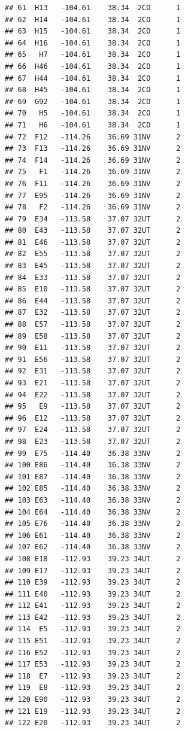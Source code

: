 \documentclass[]{article}
\begin{document}
\begin{verbatim}
## 61  H13   -104.61    38.34  2CO      1
## 62  H14   -104.61    38.34  2CO      1
## 63  H15   -104.61    38.34  2CO      1
## 64  H16   -104.61    38.34  2CO      1
## 65   H7   -104.61    38.34  2CO      1
## 66  H46   -104.61    38.34  2CO      1
## 67  H44   -104.61    38.34  2CO      1
## 68  H45   -104.61    38.34  2CO      1
## 69  G92   -104.61    38.34  2CO      1
## 70   H5   -104.61    38.34  2CO      1
## 71   H6   -104.61    38.34  2CO      1
## 72  F12   -114.26    36.69 31NV      2
## 73  F13   -114.26    36.69 31NV      2
## 74  F14   -114.26    36.69 31NV      2
## 75   F1   -114.26    36.69 31NV      2
## 76  F11   -114.26    36.69 31NV      2
## 77  E95   -114.26    36.69 31NV      2
## 78   F2   -114.26    36.69 31NV      2
## 79  E34   -113.58    37.07 32UT      2
## 80  E43   -113.58    37.07 32UT      2
## 81  E46   -113.58    37.07 32UT      2
## 82  E55   -113.58    37.07 32UT      2
## 83  E45   -113.58    37.07 32UT      2
## 84  E33   -113.58    37.07 32UT      2
## 85  E10   -113.58    37.07 32UT      2
## 86  E44   -113.58    37.07 32UT      2
## 87  E32   -113.58    37.07 32UT      2
## 88  E57   -113.58    37.07 32UT      2
## 89  E58   -113.58    37.07 32UT      2
## 90  E11   -113.58    37.07 32UT      2
## 91  E56   -113.58    37.07 32UT      2
## 92  E31   -113.58    37.07 32UT      2
## 93  E21   -113.58    37.07 32UT      2
## 94  E22   -113.58    37.07 32UT      2
## 95   E9   -113.58    37.07 32UT      2
## 96  E12   -113.58    37.07 32UT      2
## 97  E24   -113.58    37.07 32UT      2
## 98  E23   -113.58    37.07 32UT      2
## 99  E75   -114.40    36.38 33NV      2
## 100 E86   -114.40    36.38 33NV      2
## 101 E87   -114.40    36.38 33NV      2
## 102 E85   -114.40    36.38 33NV      2
## 103 E63   -114.40    36.38 33NV      2
## 104 E64   -114.40    36.38 33NV      2
## 105 E76   -114.40    36.38 33NV      2
## 106 E61   -114.40    36.38 33NV      2
## 107 E62   -114.40    36.38 33NV      2
## 108 E18   -112.93    39.23 34UT      2
## 109 E17   -112.93    39.23 34UT      2
## 110 E39   -112.93    39.23 34UT      2
## 111 E40   -112.93    39.23 34UT      2
## 112 E41   -112.93    39.23 34UT      2
## 113 E42   -112.93    39.23 34UT      2
## 114  E5   -112.93    39.23 34UT      2
## 115 E51   -112.93    39.23 34UT      2
## 116 E52   -112.93    39.23 34UT      2
## 117 E53   -112.93    39.23 34UT      2
## 118  E7   -112.93    39.23 34UT      2
## 119  E8   -112.93    39.23 34UT      2
## 120 E90   -112.93    39.23 34UT      2
## 121 E19   -112.93    39.23 34UT      2
## 122 E20   -112.93    39.23 34UT      2

\end{verbatim}
\end{document}
